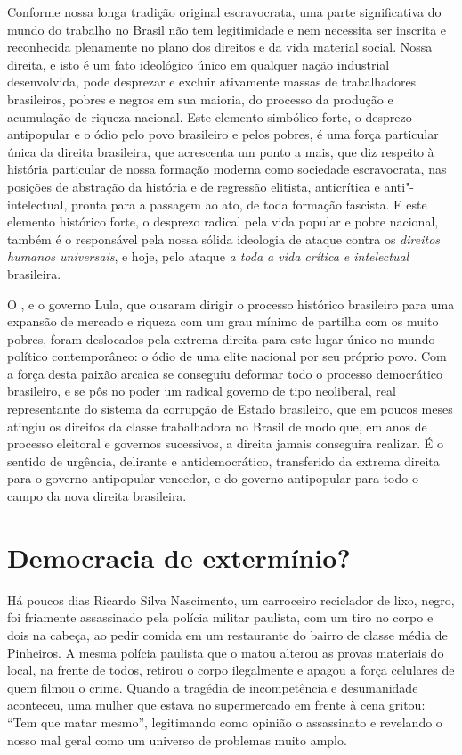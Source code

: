 Conforme nossa longa tradição original escravocrata, uma parte
significativa do mundo do trabalho no Brasil não tem legitimidade e nem
necessita ser inscrita e reconhecida plenamente no plano dos direitos e
da vida material social. Nossa direita, e isto é um fato ideológico
único em qualquer nação industrial desenvolvida, pode desprezar e
excluir ativamente massas de trabalhadores brasileiros, pobres e negros
em sua maioria, do processo da produção e acumulação de riqueza
nacional. Este elemento simbólico forte, o desprezo antipopular e o ódio
pelo povo brasileiro e pelos pobres, é uma força particular única da
direita brasileira, que acrescenta um ponto a mais, que diz respeito à
história particular de nossa formação moderna como sociedade
escravocrata, nas posições de abstração da história e de regressão
elitista, anticrítica e anti"-intelectual, pronta para a passagem ao ato,
de toda formação fascista. E este elemento histórico forte, o desprezo
radical pela vida popular e pobre nacional, também é o responsável pela
nossa sólida ideologia de ataque contra os \emph{direitos humanos
universais}, e hoje, pelo ataque \emph{a toda a vida crítica e
intelectual} brasileira.

O , e o governo Lula, que ousaram dirigir o processo histórico
brasileiro para uma expansão de mercado e riqueza com um grau mínimo de
partilha com os muito pobres, foram deslocados pela extrema direita para
este lugar único no mundo político contemporâneo: o ódio de uma elite
nacional por seu próprio povo. Com a força desta paixão arcaica se
conseguiu deformar todo o processo democrático brasileiro, e se pôs no
poder um radical governo de tipo neoliberal, real representante do
sistema da corrupção de Estado brasileiro, que em poucos meses atingiu
os direitos da classe trabalhadora no Brasil de modo que, em anos de
processo eleitoral e governos sucessivos, a direita jamais conseguira
realizar. É o sentido de urgência, delirante e antidemocrático,
transferido da extrema direita para o governo antipopular vencedor, e do
governo antipopular para todo o campo da nova direita brasileira.

\chapter{Democracia de extermínio?}

Há poucos dias Ricardo Silva Nascimento, um carroceiro reciclador de
lixo, negro, foi friamente assassinado pela polícia militar paulista,
com um tiro no corpo e dois na cabeça, ao pedir comida em um restaurante
do bairro de classe média de Pinheiros. A mesma polícia paulista que o
matou alterou as provas materiais do local, na frente de todos, retirou
o corpo ilegalmente e apagou a força celulares de quem filmou o crime.
Quando a tragédia de incompetência e desumanidade aconteceu, uma mulher
que estava no supermercado em frente à cena gritou: ``Tem que matar
mesmo'', legitimando como opinião o assassinato e revelando o nosso mal
geral como um universo de problemas muito amplo.

